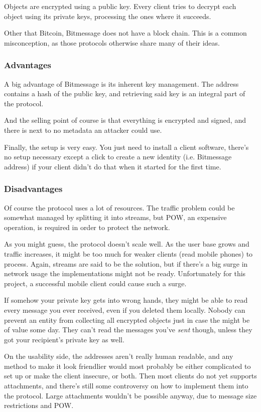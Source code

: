 \documentclass{bfh}
\begin{document}
  Objects are encrypted using a public key. Every client tries to decrypt each object using its private keys, processing the ones where it succeeds.

  Other that Bitcoin, Bitmessage does not have a block chain. This is a common misconception, as those protocols otherwise share many of their ideas.

  \subsubsection{Advantages}
  A big advantage of Bitmessage is its inherent key management. The address contains a hash of the public key, and retrieving said key is an integral part of the protocol.

  And the selling point of course is that everything is encrypted and signed, and there is next to no metadata an attacker could use.

  Finally, the setup is very easy. You just need to install a client software, there's no setup necessary except a click to create a new identity (i.e. Bitmessage address) if your client didn't do that when it started for the first time.

  \subsubsection{Disadvantages}
  Of course the protocol uses a lot of resources. The traffic problem could be somewhat managed by splitting it into streams\cite{wiki:stream}, but \acf{POW}, an expensive operation, is required in order to protect the network.

  As you might guess, the protocol doesn't scale well. As the user base grows and traffic increases, it might be too much for weaker clients (read mobile phones) to process. Again, streams are said to be the solution, but if there's a big surge in network usage the implementations might not be ready. Unfortunately for this project, a successful mobile client could cause such a surge.

  If somehow your private key gets into wrong hands, they might be able to read every message you ever received, even if you deleted them locally. Nobody can prevent an entity from collecting all encrypted objects just in case the might be of value some day. They can't read the messages you've \textit{sent} though, unless they got your recipient's private key as well.

  On the usability side, the addresses aren't really human readable, and any method to make it look friendlier would most probably be either complicated to set up or make the client insecure, or both. Then most clients do not yet supports attachments, and there's still some controversy on how to implement them into the protocol. Large attachments wouldn't be possible anyway, due to message size restrictions and \ac{POW}.
\end{document}

